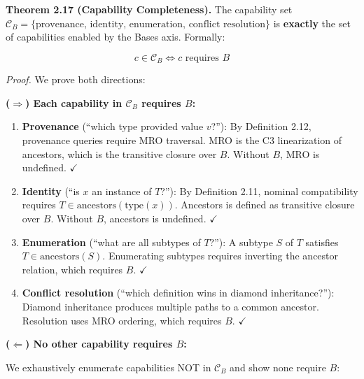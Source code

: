 \textbf{Theorem 2.17 (Capability Completeness).} The capability set
\(\mathcal{C}_B = \{\text{provenance, identity, enumeration, conflict resolution}\}\)
is \textbf{exactly} the set of capabilities enabled by the Bases axis.
Formally:

\[c \in \mathcal{C}_B \iff c \text{ requires } B\]

\emph{Proof.} We prove both directions:

\textbf{(\(\Rightarrow\)) Each capability in \(\mathcal{C}_B\) requires
\(B\):}

\begin{enumerate}
\def\labelenumi{\arabic{enumi}.}
\item
  \textbf{Provenance} (``which type provided value \(v\)?''): By
  Definition 2.12, provenance queries require MRO traversal. MRO is the
  C3 linearization of ancestors, which is the transitive closure over
  \(B\). Without \(B\), MRO is undefined. \(\checkmark\)
\item
  \textbf{Identity} (``is \(x\) an instance of \(T\)?''): By Definition
  2.11, nominal compatibility requires
  \(T \in \text{ancestors}(\text{type}(x))\). Ancestors is defined as
  transitive closure over \(B\). Without \(B\), ancestors is undefined.
  \(\checkmark\)
\item
  \textbf{Enumeration} (``what are all subtypes of \(T\)?''): A subtype
  \(S\) of \(T\) satisfies \(T \in \text{ancestors}(S)\). Enumerating
  subtypes requires inverting the ancestor relation, which requires
  \(B\). \(\checkmark\)
\item
  \textbf{Conflict resolution} (``which definition wins in diamond
  inheritance?''): Diamond inheritance produces multiple paths to a
  common ancestor. Resolution uses MRO ordering, which requires \(B\).
  \(\checkmark\)
\end{enumerate}

\textbf{(\(\Leftarrow\)) No other capability requires \(B\):}

We exhaustively enumerate capabilities NOT in \(\mathcal{C}_B\) and show
none require \(B\):

